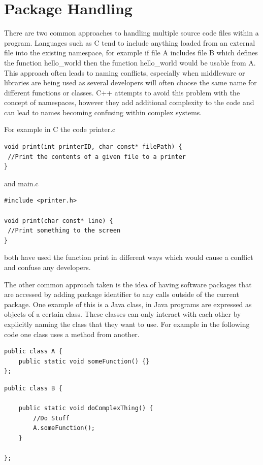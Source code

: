\documentclass[]{final_report}
\begin{document}
\chapter{Package Handling}

There are two common approaches to handling multiple source code files within a program. Languages such as C tend to include anything loaded from an external file into the existing namespace, for example if file A includes file B which defines the function hello\_world then the function hello\_world would be usable from A. This approach often leads to naming conflicts, especially when middleware or libraries are being used as several developers will often choose the same name for different functions or classes. C++ attempts to avoid this problem with the concept of namespaces, however they add additional complexity to the code and can lead to names becoming confusing within complex systems.

For example in C the code printer.c

\begin{verbatim}
void print(int printerID, char const* filePath) {
 //Print the contents of a given file to a printer
}
\end{verbatim}

and main.c
\begin{verbatim}
#include <printer.h>

void print(char const* line) {
 //Print something to the screen
}
\end{verbatim}

both have used the function print in different ways which would cause a conflict and confuse any developers.

The other common approach taken is the idea of having software packages that are accessed by adding  package identifier to any calls outside of the current package. One example of this is a Java class, in Java programs are expressed as objects of a certain class. These classes can only interact with each other by explicitly naming the class that they want to use. For example in the following code one class uses a method from another.

\begin{verbatim}
public class A {
    public static void someFunction() {}
};
\end{verbatim}

\begin{verbatim}
public class B {

    public static void doComplexThing() {
        //Do Stuff
        A.someFunction();
    }

};
\end{verbatim}
\end{document}
